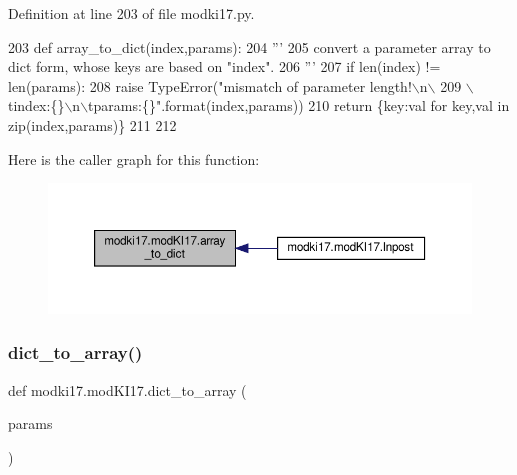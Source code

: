 Definition at line 203 of file modki17.\+py.


\begin{DoxyCode}
203     \textcolor{keyword}{def }array\_to\_dict(index,params):
204         \textcolor{stringliteral}{'''}
205 \textcolor{stringliteral}{        convert a parameter array to dict form, whose keys are based on "index".}
206 \textcolor{stringliteral}{        '''}
207         \textcolor{keywordflow}{if} len(index) != len(params):
208             \textcolor{keywordflow}{raise} TypeError(\textcolor{stringliteral}{"mismatch of parameter length!\(\backslash\)n\(\backslash\)}
209 \textcolor{stringliteral}{                             \(\backslash\)tindex:\{\}\(\backslash\)n\(\backslash\)tparams:\{\}"}.format(index,params))
210         \textcolor{keywordflow}{return} \{key:val \textcolor{keywordflow}{for} key,val \textcolor{keywordflow}{in} zip(index,params)\}
211     
212     
\end{DoxyCode}
Here is the caller graph for this function\+:\nopagebreak
\begin{figure}[H]
\begin{center}
\leavevmode
\includegraphics[width=350pt]{df/da3/classmodki17_1_1modKI17_a3dbb8b3805bcb0e1253c367f016a6073_icgraph}
\end{center}
\end{figure}
\mbox{\label{classmodki17_1_1modKI17_a8f55186927e70d2132cc05d2cde7f25f}} 
\subsubsection{\texorpdfstring{dict\+\_\+to\+\_\+array()}{dict\_to\_array()}}
{\footnotesize\ttfamily def modki17.\+mod\+K\+I17.\+dict\+\_\+to\+\_\+array (\begin{DoxyParamCaption}\item[{}]{params }\end{DoxyParamCaption})\hspace{0.3cm}{\ttfamily [static]}}

